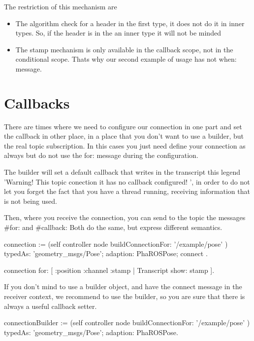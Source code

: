 \documentclass[a4paper,10pt,twoside]{book}
\begin{document}
{					The restriction of this mechanism are
					
					\begin{itemize}
						\item The algorithm check for a header in the first type, it does not do it in inner types. So, if the header is in the an inner type it will not be minded
						\item The stamp mechanism is only available in the callback scope, not in the conditional scope. Thats why our second example of usage has not when: message.
					\end{itemize}
					
					
					\section {Callbacks}
					
						There are times where we need to configure our connection in one part and set the callback in other place, in a place that you don't want to use a builder, but the real topic subscription.
						 In this cases you just need define your connection as always but do not use the for: message during the configuration. 
						
						The builder will set a default callback that writes in the transcript this legend 'Warning! This topic conection it has no callback configured! ', in order to do not let you forget the fact that you have a thread running, receiving information that is not being used.
						
						Then, where you receive the connection, you can send to the topic the messages \#for: and \#callback: Both do the same, but express different semantics.
						
						
						\begin{code}
						connection := (self controller node buildConnectionFor: '/example/pose' ) 
									typedAs: 'geometry_msgs/Pose'; 
									adaption: PhaROSPose;
									connect .
				
						connection for: [ :position :channel :stamp |  Transcript show: stamp  ].
						\end{code}


						If you don't mind to use a builder object, and have the connect message in the receiver context, we recommend to use the builder, so you are sure that there is always a useful callback setter. 
						
						
						
						\begin{code}
						connectionBuilder := (self controller node buildConnectionFor: '/example/pose' ) 
									typedAs: 'geometry_msgs/Pose'; 
									adaption: PhaROSPose.
													

\end{code}}
\end{document}

